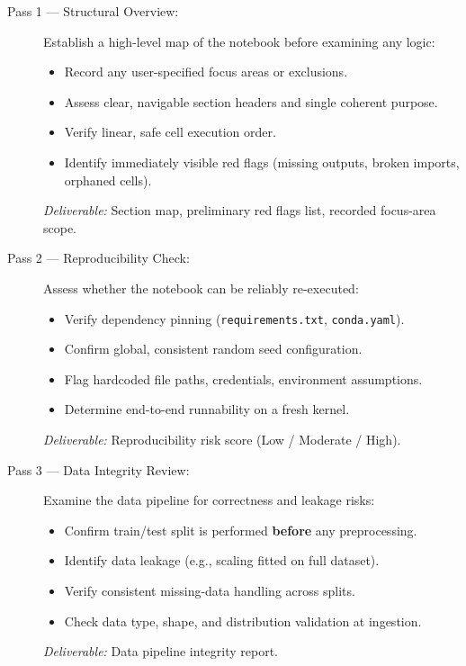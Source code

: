 \documentclass[11pt, a4paper]{article}
\begin{document}
\begin{description}

  \item[Pass 1 — Structural Overview:]
  Establish a high-level map of the notebook before examining any logic:
  \begin{itemize}
    \item Record any user-specified focus areas or exclusions.
    \item Assess clear, navigable section headers and single coherent purpose.
    \item Verify linear, safe cell execution order.
    \item Identify immediately visible red flags (missing outputs, broken
      imports, orphaned cells).
  \end{itemize}
  \textit{Deliverable:} Section map, preliminary red flags list, recorded
  focus-area scope.

  \item[Pass 2 — Reproducibility Check:]
  Assess whether the notebook can be reliably re-executed:
  \begin{itemize}
    \item Verify dependency pinning (\texttt{requirements.txt},
      \texttt{conda.yaml}).
    \item Confirm global, consistent random seed configuration.
    \item Flag hardcoded file paths, credentials, environment assumptions.
    \item Determine end-to-end runnability on a fresh kernel.
  \end{itemize}
  \textit{Deliverable:} Reproducibility risk score (Low / Moderate / High).

  \item[Pass 3 — Data Integrity Review:]
  Examine the data pipeline for correctness and leakage risks:
  \begin{itemize}
    \item Confirm train/test split is performed \textbf{before} any
      preprocessing.
    \item Identify data leakage (e.g., scaling fitted on full dataset).
    \item Verify consistent missing-data handling across splits.
    \item Check data type, shape, and distribution validation at ingestion.
  \end{itemize}
  \textit{Deliverable:} Data pipeline integrity report.


\end{description}
\end{document}
